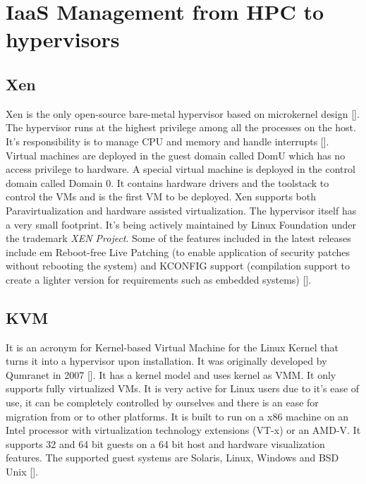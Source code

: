 \section{IaaS Management from HPC to hypervisors}

\subsection{Xen}

Xen is the only open-source bare-metal hypervisor based on microkernel
design [\cite{www-xen-wikipedia}]. The hypervisor runs at the highest
privilege among all the processes on the host. It's responsibility is
to manage CPU and memory and handle
interrupts [\cite{www-xen-overview}]. Virtual machines are deployed in
the guest domain called DomU which has no access privilege to
hardware. A special virtual machine is deployed in the control domain
called Domain 0. It contains hardware drivers and the toolstack to
control the VMs and is the first VM to be deployed. Xen supports both
Paravirtualization and hardware assisted virtualization. The
hypervisor itself has a very small footprint. It's being actively
maintained by Linux Foundation under the trademark \textit{XEN
  Project}. Some of the features included in the latest releases
include {em Reboot-free Live Patching} (to enable application of
security patches without rebooting the system) and KCONFIG support
(compilation support to create a lighter version for requirements such
as embedded systems) [\cite{www-xen-fl}].
          
\subsection{KVM}

It is an acronym for Kernel-based Virtual Machine for the Linux Kernel
that turns it into a hypervisor upon installation. It was originally
developed by Qumranet in 2007 [\cite{www-KVM-wiki}]. It has a kernel
model and uses kernel as VMM. It only supports fully virtualized
VMs. It is very active for Linux users due to it's ease of use, it can
be completely controlled by ourselves and there is an ease for
migration from or to other platforms. It is built to run on a x86
machine on an Intel processor with virtualization technology
extensions (VT-x) or an AMD-V. It supports 32 and 64 bit guests on a
64 bit host and hardware visualization features. The supported guest
systems are Solaris, Linux, Windows and BSD
Unix [\cite{www-KVM-webpage}].

